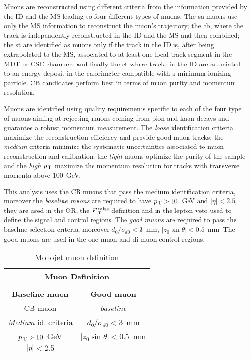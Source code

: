 Muons are reconstructed using different criteria from the information provided
by the ID and the MS leading to four different types of muons. The \gls{sa}
muons use only the MS information to reconstruct the muon's trajectory; the
\gls{cb}, where the track is independently reconstructed in the ID and the MS
and then combined; the \gls{st} are identified as muons only if the track in the
ID is, after being extrapolated to the MS, associated to at least one local
track segment in the MDT or CSC chambers and finally the \gls{ct} where tracks
in the ID are associated to an energy deposit in the calorimeter compatible with
a minimum ionizing particle. CB candidates perform best in terms of muon purity
and momentum resolution.

Muons are identified using quality requirements specific to each of the four
type of muons aiming at rejecting muons coming from pion and kaon decays and
guarantee a robust momentum measurement. The \emph{loose} identification
criteria maximize the reconstruction efficiency and provide good muon tracks;
the \emph{medium} criteria minimize the systematic uncertainties associated to
muon reconstruction and calibration; the \emph{tight} muons optimize the purity
of the sample and the \emph{high $p_\mathrm{\, T}$} maximize the momentum resolution for
tracks with transverse momenta above 100~GeV\cite{MUONS}.

This analysis uses the CB muons that pass the medium identification criteria,
moreover the \emph{baseline muons} are required to have $p_\mathrm{\, T} > 10$~GeV and
$|\eta| < 2.5$, they are used in the OR, the $E_\mathrm{\, T}^\mathrm{\, miss}$ definition and in the lepton
veto used to define the signal and control regions. The \emph{good muons} are
required to pass the baseline selection criteria, moreover $d_0 / \sigma_{d0} <
3$~mm, $|z_0 \sin \theta| < 0.5$~mm. The good muons are used in the one muon and
di-muon control regions.

\begin{table}[!th]
  \centering
  \begin{tabular}{cc}
    \multicolumn{2}{c}{Muon Definition} \\
    \hline \hline \\
    \textbf{Baseline muon} & \textbf{Good muon} \\
    \hline
    CB muon & \emph{baseline} \\
    \emph{Medium} id. criteria & $d_0 / \sigma_{d0} < 3$~mm \\
    $p_\mathrm{\, T} > 10$~GeV & $|z_0 \sin \theta| < 0.5$~mm \\
    $|\eta| < 2.5$ & \\
    \hline \hline
  \end{tabular}
  \caption{Monojet muon definition}
  \label{tab:ele_def}
\end{table}

